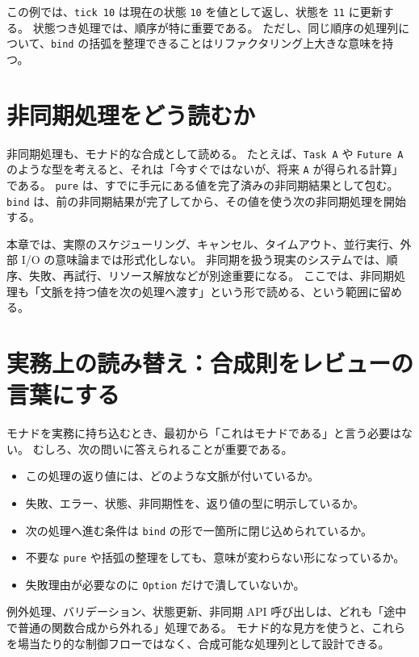 この例では、\texttt{tick 10} は現在の状態 \texttt{10} を値として返し、状態を \texttt{11} に更新する。
状態つき処理では、順序が特に重要である。
ただし、同じ順序の処理列について、\texttt{bind} の括弧を整理できることはリファクタリング上大きな意味を持つ。

\section{非同期処理をどう読むか}

非同期処理も、モナド的な合成として読める。
たとえば、\texttt{Task A} や \texttt{Future A} のような型を考えると、それは「今すぐではないが、将来 \texttt{A} が得られる計算」である。
\texttt{pure} は、すでに手元にある値を完了済みの非同期結果として包む。
\texttt{bind} は、前の非同期結果が完了してから、その値を使う次の非同期処理を開始する。

\begin{warningbox}
本章では、実際のスケジューリング、キャンセル、タイムアウト、並行実行、外部 I/O の意味論までは形式化しない。
非同期を扱う現実のシステムでは、順序、失敗、再試行、リソース解放などが別途重要になる。
ここでは、非同期処理も「文脈を持つ値を次の処理へ渡す」という形で読める、という範囲に留める。
\end{warningbox}

\section{実務上の読み替え：合成則をレビューの言葉にする}

モナドを実務に持ち込むとき、最初から「これはモナドである」と言う必要はない。
むしろ、次の問いに答えられることが重要である。

\begin{itemize}
\item この処理の返り値には、どのような文脈が付いているか。
\item 失敗、エラー、状態、非同期性を、返り値の型に明示しているか。
\item 次の処理へ進む条件は \texttt{bind} の形で一箇所に閉じ込められているか。
\item 不要な \texttt{pure} や括弧の整理をしても、意味が変わらない形になっているか。
\item 失敗理由が必要なのに \texttt{Option} だけで潰していないか。
\end{itemize}

\begin{softwarebox}
例外処理、バリデーション、状態更新、非同期 API 呼び出しは、どれも「途中で普通の関数合成から外れる」処理である。
モナド的な見方を使うと、これらを場当たり的な制御フローではなく、合成可能な処理列として設計できる。
\end{softwarebox}


